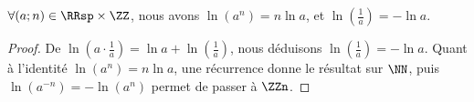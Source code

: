 

\begin{fact} \label{ln-id}
	$\forall (a;n) \in \RRsp \times \ZZ$,
	nous avons
	$\ln(a^n) = n \ln a$,
	et
	$\ln(\frac1a) = - \ln a$.
\end{fact}


\begin{proof}
	De $\ln(a \cdot \frac1a) = \ln a + \ln(\frac1a)$, nous déduisons $\ln(\frac1a) = - \ln a$.
	Quant à l'identité $\ln(a^n) = n \ln a$, une récurrence donne le résultat sur $\NN$, puis $\ln(a^{-n}) = -\ln(a^n)$ permet de passer à $\ZZn$.
\end{proof}